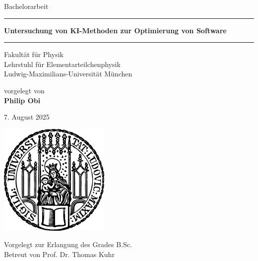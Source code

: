 \newcommand{\supervisor}{Prof. Dr. Thomas Kuhr}
\newcommand{\name}{Philip Obi}
\newcommand{\dateDe}{7. August 2025}
\newcommand{\dateEn}{7 August 2025}
\newcommand{\titleDe}{Untersuchung von KI-Methoden zur Optimierung von Software}
\newcommand{\titleEn}{Exploration of AI Methods for Software Optimization}

\begin{titlepage}
  \begin{center}
    \LARGE Bachelorarbeit

    \vspace{0.5cm}
    \rule{\textwidth}{1.5pt}
    \LARGE\textbf{\titleDe}
    \rule{\textwidth}{1.5pt}

    \vspace{0.5cm}
    \large
    Fakultät für Physik \\
    Lehrstuhl für Elementarteilchenphysik \\
    Ludwig-Maximilians-Universität München

    \vfill
    vorgelegt von \\
    \Large \textbf{\name}

    \vfill
    \large \dateDe

    \vfill
    \includegraphics[width=0.4\textwidth]{static/sigillum.png}

    \vfill
    \normalsize Vorgelegt zur Erlangung des Grades B.Sc. \\
    Betreut von \supervisor
  \end{center}
\end{titlepage}
\newpage

\null\thispagestyle{empty}

